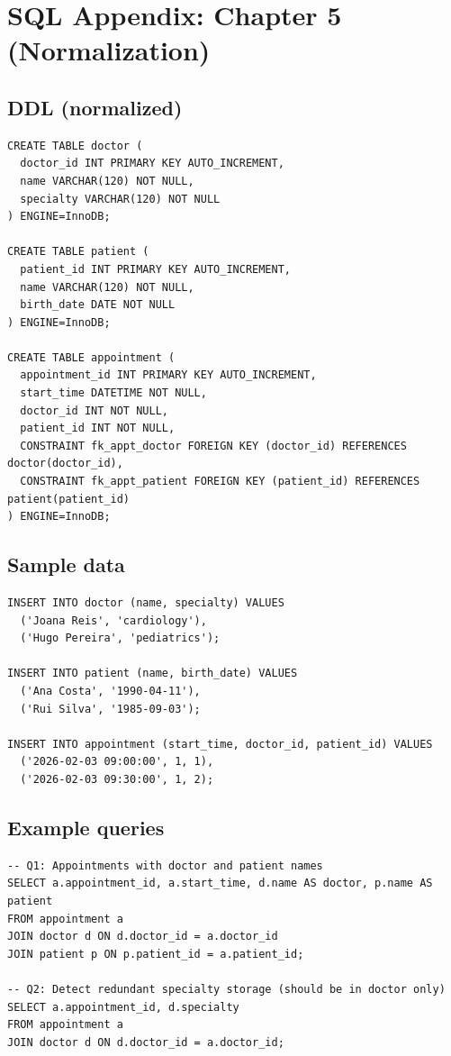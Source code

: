 \chapter{SQL Appendix: Chapter 5 (Normalization)}

\section{DDL (normalized)}
\begin{verbatim}
CREATE TABLE doctor (
  doctor_id INT PRIMARY KEY AUTO_INCREMENT,
  name VARCHAR(120) NOT NULL,
  specialty VARCHAR(120) NOT NULL
) ENGINE=InnoDB;

CREATE TABLE patient (
  patient_id INT PRIMARY KEY AUTO_INCREMENT,
  name VARCHAR(120) NOT NULL,
  birth_date DATE NOT NULL
) ENGINE=InnoDB;

CREATE TABLE appointment (
  appointment_id INT PRIMARY KEY AUTO_INCREMENT,
  start_time DATETIME NOT NULL,
  doctor_id INT NOT NULL,
  patient_id INT NOT NULL,
  CONSTRAINT fk_appt_doctor FOREIGN KEY (doctor_id) REFERENCES doctor(doctor_id),
  CONSTRAINT fk_appt_patient FOREIGN KEY (patient_id) REFERENCES patient(patient_id)
) ENGINE=InnoDB;
\end{verbatim}

\section{Sample data}
\begin{verbatim}
INSERT INTO doctor (name, specialty) VALUES
  ('Joana Reis', 'cardiology'),
  ('Hugo Pereira', 'pediatrics');

INSERT INTO patient (name, birth_date) VALUES
  ('Ana Costa', '1990-04-11'),
  ('Rui Silva', '1985-09-03');

INSERT INTO appointment (start_time, doctor_id, patient_id) VALUES
  ('2026-02-03 09:00:00', 1, 1),
  ('2026-02-03 09:30:00', 1, 2);
\end{verbatim}

\section{Example queries}
\begin{verbatim}
-- Q1: Appointments with doctor and patient names
SELECT a.appointment_id, a.start_time, d.name AS doctor, p.name AS patient
FROM appointment a
JOIN doctor d ON d.doctor_id = a.doctor_id
JOIN patient p ON p.patient_id = a.patient_id;

-- Q2: Detect redundant specialty storage (should be in doctor only)
SELECT a.appointment_id, d.specialty
FROM appointment a
JOIN doctor d ON d.doctor_id = a.doctor_id;
\end{verbatim}
